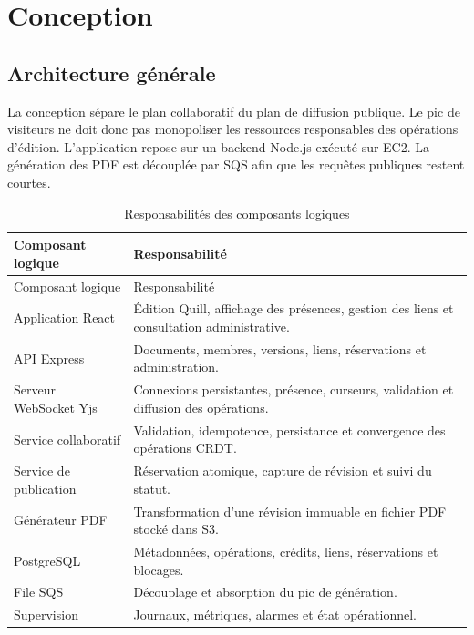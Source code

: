 \chapter{Conception}

\section{Architecture générale}
La conception sépare le plan collaboratif du plan de diffusion publique. Le pic de visiteurs ne doit donc pas monopoliser les ressources responsables des opérations d'édition. L'application repose sur un backend Node.js exécuté sur EC2. La génération des PDF est découplée par SQS afin que les requêtes publiques restent courtes.



\begingroup\small\setlength{\tabcolsep}{3pt}\renewcommand{\arraystretch}{1.25}
\begin{longtable}{|P{0.26\textwidth}|P{0.69\textwidth}|}
\caption{Responsabilités des composants logiques}\\
\hline
Composant logique & Responsabilité \\ \hline
\endfirsthead
\hline
Composant logique & Responsabilité \\ \hline
\endhead
\endfoot

Application React & Édition Quill, affichage des présences, gestion des liens et consultation administrative. \\ \hline

API Express & Documents, membres, versions, liens, réservations et administration. \\ \hline

Serveur WebSocket Yjs & Connexions persistantes, présence, curseurs, validation et diffusion des opérations. \\ \hline

Service collaboratif & Validation, idempotence, persistance et convergence des opérations CRDT. \\ \hline

Service de publication & Réservation atomique, capture de révision et suivi du statut. \\ \hline

Générateur PDF & Transformation d'une révision immuable en fichier PDF stocké dans S3. \\ \hline

PostgreSQL & Métadonnées, opérations, crédits, liens, réservations et blocages. \\ \hline

File SQS & Découplage et absorption du pic de génération. \\ \hline

Supervision & Journaux, métriques, alarmes et état opérationnel. \\ \hline

\end{longtable}\endgroup

